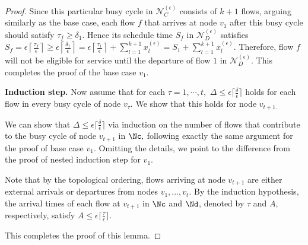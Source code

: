\begin{proof}
	Since this particular busy cycle in $\mathcal{N}_{C}^{(\epsilon)}$
	consists of $k+1$ flows, arguing similarly as the base case, each
	flow $f$ that arrives at node $v_{1}$ after this busy cycle should
	satisfy $\tau_{f}\geq\delta_{1}.$ Hence its schedule time $S_{f}$
	in $\mathcal{N}_{D}^{(\epsilon)}$ satisfies $S_{f}=\epsilon\left\lceil \frac{\tau_{f}}{\epsilon}\right\rceil \geq\epsilon\left\lceil \frac{\delta_{1}}{\epsilon}\right\rceil =\epsilon\left\lceil \frac{\tau_{1}}{\epsilon}\right\rceil +\sum_{l=1}^{k+1}x_{l}^{(\epsilon)}=S_{1}+\sum_{l=1}^{k+1}x_{l}^{(\epsilon)}.$
	Therefore, flow $f$ will not be eligible for service until the departure
	of flow $1$ in $\mathcal{N}_{D}^{(\epsilon)}.$ This completes the
	proof of the base case $v_{1}$.
	
	\textbf{Induction step. }Now assume that for each $\tau=1,\cdots,t,$
	$\Delta\leq\epsilon\lceil\frac{\delta}{\epsilon}\rceil$ holds for
	each flow in every busy cycle of node $v_{\tau}.$ We show that this
	holds for node $v_{t+1.}$
	
	We can show that $\Delta\leq\epsilon\lceil\frac{\delta}{\epsilon}\rceil$
	via induction on the number of flows that contribute to the busy cycle
	of node $v_{t+1}$ in $\Nc,$ following exactly the same argument
	for the proof of base case $v_{1}.$ Omitting the details, we point
	to the difference from the proof of nested induction step for $v_1$. 
	
	Note that by the topological ordering, flows arriving at node $v_{t+1}$
	are either external arrivals or departures from nodes $v_{1},\ldots,v_{t}.$
	By the induction hypothesis, the arrival times of each flow at $v_{t+1}$
	in $\Nc$ and $\Nd$, denoted by $\tau$ and $A,$ respectively,
	satisfy $A\leq\epsilon\lceil\frac{\tau}{\epsilon}\rceil.$ 
	
	This completes the proof of this lemma.
\end{proof}

\smallskip

